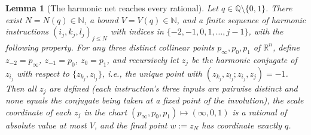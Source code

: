 \documentclass[11pt]{amsart}
\newtheorem{lemma}[theorem]{Lemma}
\theoremstyle{definition}
\newcommand{\R}{\mathbb{R}}
\newcommand{\Q}{\mathbb{Q}}
\begin{document}
\begin{lemma}[The harmonic net reaches every rational]
\label{lem:net}
Let $q\in\Q\setminus\{0,1\}$. There exist $N=N(q)\in\mathbb{N}$, a bound
$V=V(q)\in\mathbb{N}$, and a finite sequence of \emph{harmonic instructions}
$(i_j,k_j,l_j)_{j\le N}$ with indices in $\{-2,-1,0,1,\dots,j-1\}$, with the
following property. For any three distinct collinear points $p_\infty,p_0,p_1$
of $\R^n$, define $z_{-2}=p_\infty$, $z_{-1}=p_0$, $z_0=p_1$, and
recursively let $z_j$ be the harmonic conjugate of $z_{i_j}$ with respect to
$\{z_{k_j},z_{l_j}\}$, i.e., the unique point with
$(z_{k_j},z_{l_j};z_{i_j},z_j)=-1$. Then all $z_j$ are defined \textup(each
instruction's three inputs are pairwise distinct and none equals the conjugate
being taken at a fixed point of the involution\textup), the scale coordinate
of each $z_j$ in the chart $(p_\infty,p_0,p_1)\mapsto(\infty,0,1)$ is a
rational of absolute value at most $V$, and the final point $w:=z_N$ has
coordinate exactly $q$.
\end{lemma}
\end{document}
